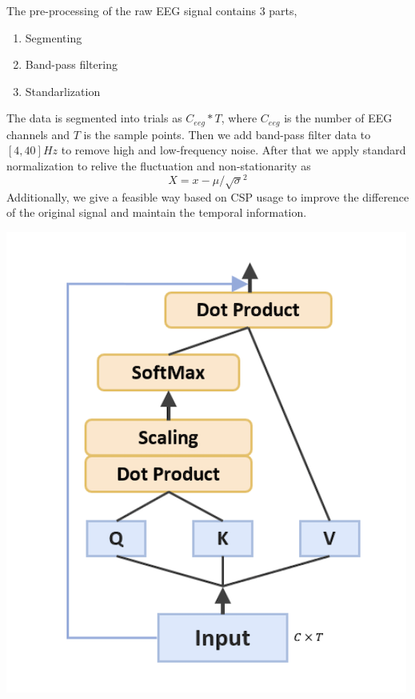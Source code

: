 \documentclass[a0,portrait]{a0poster}
\begin{document}
\begin{minipage}[c]{\linewidth}
\begin{framed}
\begin{multicols}{2}
The pre-processing of the raw EEG signal contains 3 parts, 
\begin{enumerate}
\item Segmenting
\item Band-pass filtering
\item Standarlization
\end{enumerate}
The data is segmented into trials as $C_{eeg}*T$, where $C_{eeg}$ is the number of EEG channels and $T$ is the sample points. Then we add band-pass filter data to $[4,40]Hz$ to remove high and low-frequency noise. After that we apply standard normalization to relive the fluctuation and non-stationarity  as $$X={x-\mu}/{\sqrt{\sigma}^2}$$Additionally, we give a feasible way based on CSP usage to improve the difference of the original signal and maintain the temporal information.
\begin {center}
\includegraphics{figures/dot}
\label{dot}
\end{center}

\end{multicols}
\end{framed}
\end{minipage}
\end{document}
